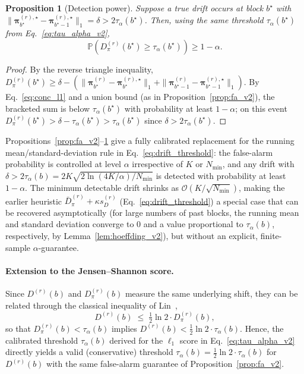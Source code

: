 ﻿\documentclass[12pt,a4paper]{article}
\newtheorem{proposition}{Proposition}
\DeclareMathOperator{\JS}{D_{JS}}
\begin{document}
\begin{proposition}[Detection power]
	\label{prop:power_v2}
	Suppose a true drift occurs at block $b^\star$ with
	$\|\bm\pi_{b^\star}^{(r),\star}-\bm\pi_{b^\star-1}^{(r),\star}\|_1=\delta>2\tau_\alpha(b^\star)$.
	Then, using the same threshold $\tau_\alpha(b^\star)$ from
	Eq.~\eqref{eq:tau_alpha_v2},
	\begin{equation}
		\mathbb{P}\!\left(D_\pi^{(r)}(b^\star)\geq\tau_\alpha(b^\star)\right)\geq1-\alpha.
		\label{eq:power_bound_v2}
	\end{equation}
\end{proposition}
\begin{proof}
	By the reverse triangle inequality,
	$D_\pi^{(r)}(b^\star)\geq\delta-\left(\|\bm\pi_{b^\star}^{(r)}-\bm\pi_{b^\star}^{(r),\star}\|_1+\|\bm\pi_{b^\star-1}^{(r)}-\bm\pi_{b^\star-1}^{(r),\star}\|_1\right)$.
	By Eq.~\eqref{eq:conc_l1} and a union bound (as in
	Proposition~\ref{prop:fa_v2}), the bracketed sum is below
	$\tau_\alpha(b^\star)$ with probability at least $1-\alpha$; on this
	event $D_\pi^{(r)}(b^\star)>\delta-\tau_\alpha(b^\star)>\tau_\alpha(b^\star)$
	since $\delta>2\tau_\alpha(b^\star)$.
\end{proof}

Propositions~\ref{prop:fa_v2}--\ref{prop:power_v2} give a fully calibrated
replacement for the running mean/standard-deviation rule in
Eq.~\eqref{eq:drift_threshold}: the false-alarm probability is controlled at
level $\alpha$ irrespective of $K$ or $N_{\min}$, and any drift with
$\delta>2\tau_\alpha(b)=2K\sqrt{2\ln(4K/\alpha)/N_{\min}}$ is detected with
probability at least $1-\alpha$. The minimum detectable drift shrinks as
$\mathcal{O}(K/\sqrt{N_{\min}})$, making the earlier heuristic
$\bar D_\pi^{(r)}+\kappa s_D^{(r)}$ (Eq.~\eqref{eq:drift_threshold}) a special
case that can be recovered asymptotically (for large numbers of past
blocks, the running mean and standard deviation converge to $0$ and a value
proportional to $\tau_\alpha(b)$, respectively, by
Lemma~\ref{lem:hoeffding_v2}), but without an explicit, finite-sample
$\alpha$-guarantee.

\paragraph{Extension to the Jensen--Shannon score.} Since $D_{\JS}^{(r)}(b)$
and $D_\pi^{(r)}(b)$ measure the same underlying shift, they can be related
through the classical inequality of Lin~\cite{Lin1991},
\begin{equation}
	D_{\JS}^{(r)}(b)\;\leq\;\tfrac{1}{2}\ln 2\cdot D_\pi^{(r)}(b),
	\label{eq:js_l1_link}
\end{equation}
so that $D_\pi^{(r)}(b)<\tau_\alpha(b)$ implies
$D_{\JS}^{(r)}(b)<\tfrac{1}{2}\ln2\cdot\tau_\alpha(b)$. Hence, the calibrated
threshold $\tau_\alpha(b)$ derived for the $\ell_1$ score in
Eq.~\eqref{eq:tau_alpha_v2} directly yields a valid (conservative) threshold
$\tau_\alpha^{\JS}(b)=\tfrac{1}{2}\ln2\cdot\tau_\alpha(b)$ for $D_{\JS}^{(r)}(b)$
with the same false-alarm guarantee of Proposition~\ref{prop:fa_v2}.
\end{document}
